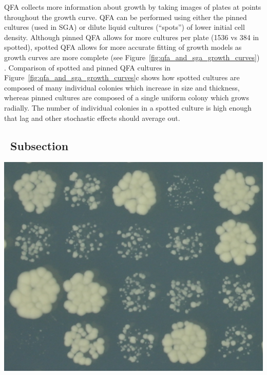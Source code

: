 





QFA
collects more information about growth by taking images of plates at
points throughout the growth curve. QFA can be performed using either
the pinned cultures (used in SGA) or dilute liquid cultures
(``spots'') of lower initial cell density. Although pinned QFA allows
for more cultures per plate (1536 vs 384 in spotted), spotted QFA
allows for more accurate fitting of growth models as growth curves are
more complete (see Figure~\ref{fig:qfa_and_sga_growth_curves})
\citep{Lawless2010}. Comparison of spotted and pinned QFA cultures in
Figure~\ref{fig:qfa_and_sga_growth_curves}c shows how spotted cultures
are composed of many individual colonies which increase in size and
thickness, whereas pinned cultures are composed of a single uniform
colony which grows radially. The number of individual colonies in a
spotted culture is high enough that lag and other stochastic effects
should average out.






\subsection{\thesubsection~Subsection}

\begin{Figure}
  \centering
  \includegraphics[width=\linewidth]{p15_section/p15_section}
  \label{fig:p15_section}
\end{Figure}


